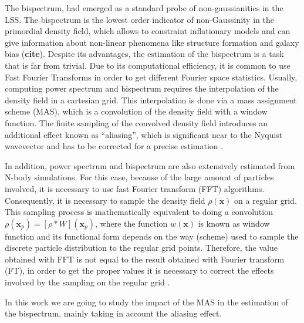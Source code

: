 \documentclass[a4paper,fleqn,usenatbib]{mnras}
\begin{document}
The bispectrum, had emerged as a standard probe of non-gaussianities in the LSS. 
The bispectrum is the lowest order indicator of non-Gaussinity in the primordial 
density field, which allows to constraint inflationary models and can give 
information about non-linear phenomena like structure formation and galaxy bias 
(\textbf{cite}). Despite its advantages, the estimation of the bispectrum is a 
task that is far from trivial. Due to its computational efficiency, it is common 
to use Fast Fourier Transforms in order to get different Fourier space 
statistics. Usually, computing power spectrum and bispectrum requires the 
interpolation of the density field in a cartesian grid. This  interpolation is 
done via a mass assignment scheme (MAS), which is a convolution of the density 
field with a window function. The finite sampling of the convolved density field 
introduces an additional effect known as ``aliasing'', which is significant near 
to the Nyquist wavevector and has to be corrected for a precise estimation 
\citep{HockneyEastwood1981,Jing2005,Jeong2010}.


In addition, power spectrum and bispectrum are also extensively estimated from 
N-body simulations. For this case, because of the large amount of particles 
involved, it is necessary to use fast Fourier transform (FFT) algorithms. 
Consequently, it is necessary to sample the density field $\rho(\mathbf{x})$ on 
a regular grid. This sampling process is mathematically equivalent to doing a 
convolution $\rho(\mathbf{x}_p)=\left[\rho * W\right](\mathbf{x}_p)$, where the 
function $w(\mathbf{x})$ is known as window function and its functional form 
depends on the way (scheme) used to sample the discrete particle distribution 
to the regular grid points. Therefore, the value obtained with FFT is not equal 
to the result obtained with Fourier transform (FT), in order to get the proper 
values it is necessary to correct the effects involved by the sampling on the 
regular grid \citep{Jing2005,Cui2008}.

In this work we are going to study the impact of the MAS in the estimation of 
the bispectrum, mainly taking in account the aliasing effect.
\end{document}
